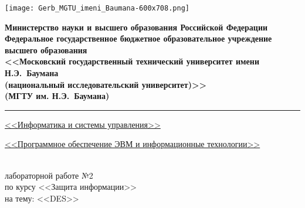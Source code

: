 \clearpage

\thispagestyle{fancy}
\renewcommand{\headrulewidth}{0pt}
\fancyhead{}

{
    \linespread{1}

    \noindent\begin{minipage}{0.12\textwidth}
        \texttt{[image: Gerb\_MGTU\_imeni\_Baumana-600x708.png]}
    \end{minipage}
    \hfill
    \noindent\begin{minipage}{0.83\textwidth}\centering
        \centering
        \small
        \bfseries
        Министерство науки и высшего образования Российской Федерации\\
        Федеральное государственное бюджетное образовательное учреждение высшего образования\\
        <<Московский государственный технический университет имени Н.Э.~Баумана\\
        (национальный исследовательский университет)>>\\
        (МГТУ им. Н.Э.~Баумана)
    \end{minipage}
}

\noindent\rule{\linewidth}{3pt}

{
\small
{} \uline{\hfill<<Информатика и системы управления>>\hfill}

 \uline{\hfill<<Программное обеспечение ЭВМ и информационные технологии>>\hfill}
}

\vspace{7\baselineskip}

\begin{center}
    {\Large{}} \\
    { лабораторной работе №2} \\
    по курсу <<Защита информации>> \\
    на тему: <<DES>> \\
\end{center}

\vspace{6\baselineskip}

